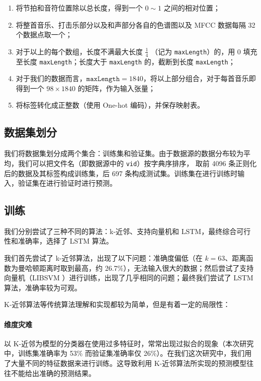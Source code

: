 \documentclass[a4paper,utf8,10pt]{article}
\newcommand{\sept}{\setlength\itemsep{-4pt}}
\begin{document}
\begin{enumerate}
  \sept
  \item 将节拍和音符位置除以总长度，得到一个 $0 \sim 1$ 之间的相对位置；
  \item 将整首音乐、打击乐部分以及和声部分各自的色谱图以及 MFCC 数据每隔 32 个数据点取一个；
  \item 对于以上的每个数组，长度不满最大长度 $\displaystyle\frac{1}{4}$ （记为 \texttt{maxLength}）的，用 0 填充至长度 \texttt{maxLength}；长度大于 \texttt{maxLength} 的，截断到长度 \texttt{maxLength}；
  \item 对于我们的数据而言，$\mathtt{maxLength} = 1840$，将以上部分组合，对于每首音乐即得到一个 $98 \times 1840$ 的矩阵，作为输入张量；
  \item 将标签转化成正整数（使用 One-hot 编码），并保存映射表。
\end{enumerate}

\subsection{数据集划分}\label{sec:split}

我们将数据集划分成两个集合：训练集和验证集。由于数据源的数据分布较为平均，我们可以把文件名（即数据源中的 \texttt{vid}）按字典序排序，
取前 4096 条正则化后的数据及其标签构成训练集，后 697 条构成测试集。训练集在进行训练时输入，验证集在进行验证时进行预测。

\subsection{训练}\label{sec:train}

我们分别尝试了三种不同的算法：k-近邻、支持向量机和 LSTM，最终综合可行性和准确率，选择了 LSTM 算法。

我们首先尝试了 k-近邻算法，出现了以下问题：准确度偏低（在 $k=63$、距离函数为曼哈顿距离时取到最高，约 26.7\%），无法输入很大的数据；然后尝试了支持向量机（LIBSVM \cite{CC01a}）进行训练，出现了几乎相同的问题；最终我们尝试了 LSTM 算法，准确率较为可观。

K-近邻算法等传统算法理解和实现都较为简单，但是有着一定的局限性：
\vspace{-10pt}
\paragraph{维度灾难} 以 K-近邻为模型的分类器在使用过多特征时，常常出现过拟合的现象（本次研究中，训练集准确率为 53\% 而验证集准确率仅 26\%）。在我们这次研究中，我们用了大量不同的特征数据来进行训练。这导致利用 K-近邻算法所实现的预测模型往往不能给出准确的预测结果。
\vspace{-10pt}
\end{document}
